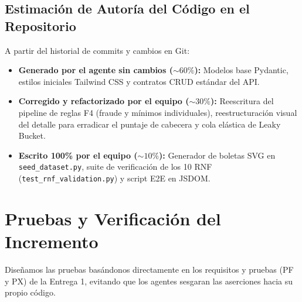 \documentclass[11pt,letterpaper]{article}
\begin{document}
\subsection{Estimación de Autoría del Código en el Repositorio}
A partir del historial de commits y cambios en Git:
\begin{itemize}
    \item \textbf{Generado por el agente sin cambios ($\sim 60\%$):} Modelos base Pydantic, estilos iniciales Tailwind CSS y contratos CRUD estándar del API.
    \item \textbf{Corregido y refactorizado por el equipo ($\sim 30\%$):} Reescritura del pipeline de reglas F4 (fraude y mínimos individuales), reestructuración visual del detalle para erradicar el puntaje de cabecera y cola elástica de Leaky Bucket.
    \item \textbf{Escrito 100\% por el equipo ($\sim 10\%$):} Generador de boletas SVG en \texttt{seed\_dataset.py}, suite de verificación de los 10 RNF (\texttt{test\_rnf\_validation.py}) y script E2E en JSDOM.
\end{itemize}

\newpage

\section{Pruebas y Verificación del Incremento}

Diseñamos las pruebas basándonos directamente en los requisitos y pruebas (PF y PX) de la Entrega 1, evitando que los agentes sesgaran las aserciones hacia su propio código.
\end{document}
